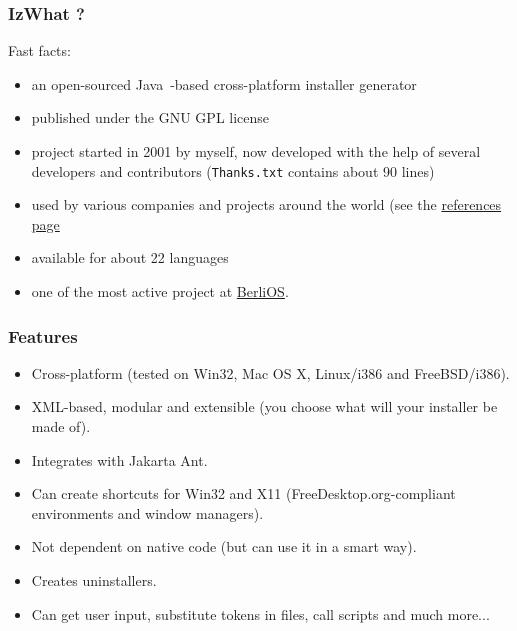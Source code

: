 \documentclass{beamer}
\begin{document}
\begin{frame}

\frametitle{IzWhat ?}

Fast facts:
  \begin{itemize}
    \item an open-sourced Java\texttrademark~-based cross-platform installer
    generator

    \item published under the GNU GPL license

    \item project started in 2001 by myself, now developed with the help of
    several developers and contributors (\texttt{Thanks.txt} contains about 90
    lines)

    \item used by various companies and projects around the world (see the
    \href{http://www.izforge.com/izpack/index.php?page=references}{references
    page}

    \item available for about 22 languages

    \item one of the most active project at
    \href{http://www.berlios.de/}{BerliOS}.
  \end{itemize}

\end{frame}


\begin{frame}

\frametitle{Features}

\begin{itemize}

  \item Cross-platform (tested on Win32, Mac OS X, Linux/i386 and FreeBSD/i386).

  \item XML-based, modular and extensible (you choose what will your installer be
  made of).

  \item Integrates with Jakarta Ant.

  \item Can create shortcuts for Win32 and X11 (FreeDesktop.org-compliant
  environments and window managers).

  \item Not dependent on native code (but can use it in a smart way).

  \item Creates uninstallers.

  \item Can get user input, substitute tokens in files, call scripts and much
  more...

\end{itemize}

\end{frame}
\end{document}
